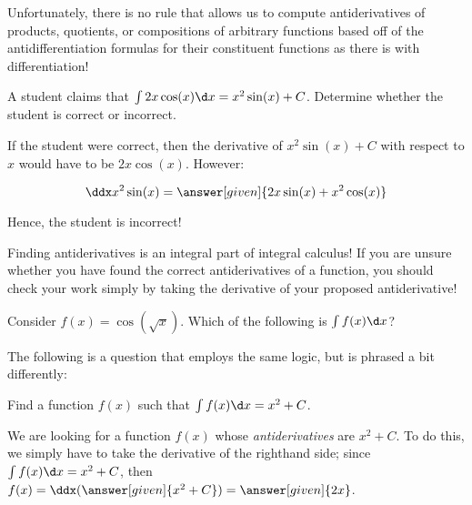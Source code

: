 \documentclass[nooutcomes]{ximera}
\begin{document}


Unfortunately, there is no rule that allows us to compute antiderivatives of products, quotients, or compositions of arbitrary functions based off of the antidifferentiation formulas for their constituent functions as there is with differentiation!  


\begin{example}
  A student claims that $\int 2x \cos(x) \d x = x^2 \sin(x) +C$.  Determine whether the student is correct or incorrect.
  
  \begin{explanation}
    If the student were correct, then the derivative of $x^2 \sin(x) +C$ with respect to $x$ would have to be $2x \cos(x)$.  However:
    
      \[\ddx x^2 \sin(x) = \answer[given]{2x \sin(x) +x^2 \cos(x)} \]
      
 Hence, the student is incorrect!
  \end{explanation}
\end{example}

\begin{remark}
Finding antiderivatives is an integral part of integral calculus!  If you are unsure whether you have found the correct antiderivatives of a function, you should check your work simply by taking the derivative of your proposed antiderivative!  
\end{remark}

\begin{question}
  Consider $f(x) = \cos(\sqrt{x})$. Which of the following is $\int f(x) \d x$?  
  \begin{selectAll}
  \end{selectAll}
\end{question}

The following is a question that employs the same logic, but is phrased a bit differently:

\begin{example}
  Find a function $f(x)$ such that $\int f(x) \d x = x^2 +C$.
  
  \begin{explanation}
    We are looking for a function $f(x)$ whose \emph{antiderivatives} are $x^2+C$.  To do this, we simply have to take the derivative of the righthand side; since $\int f(x) \d x =x^2+C$, then $f(x) = \ddx(\answer[given]{x^2+C}) =\answer[given]{2x}$.
    
    \end{explanation}
\end{example}
\end{document}
